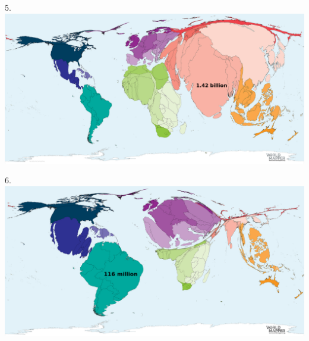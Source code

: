 \begin{frame}
\begin{center}
\Large
5. 
\\
\vspace{0.5em}\includegraphics[height=0.6\paperheight]{maps/picture_5.png}
\\
\end{center}
\end{frame}
\begin{frame}
\begin{center}
\Large
6. 
\\
\vspace{0.5em}\includegraphics[height=0.6\paperheight]{maps/picture_6.png}
\\
\end{center}
\end{frame}
